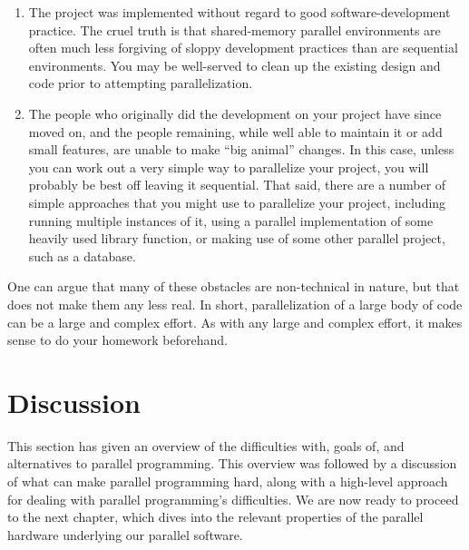 {\begin{enumerate}
		ran only on sequential hardware for most of its lifetime,
		then your project undoubtably has at least its share of
		parallel-unfriendly code.
	\item	The project was implemented without regard to good
		software-development practice.
		The cruel truth is that shared-memory parallel
		environments are often much less forgiving of sloppy
		development practices than are sequential environments.
		You may be well-served to clean up the existing design
		and code prior to attempting parallelization.
	\item	The people who originally did the development on your
		project have since moved on, and the people remaining,
		while well able to maintain it or add small features,
		are unable to make ``big animal'' changes.
		In this case, unless you can work out a very simple
		way to parallelize your project, you will probably
		be best off leaving it sequential.
		That said, there are a number of simple approaches that
		you might use
		to parallelize your project, including running multiple
		instances of it, using a parallel implementation of
		some heavily used library function, or making use of
		some other parallel project, such as a database.
	\end{enumerate}

	One can argue that many of these obstacles are non-technical
	in nature, but that does not make them any less real.
	In short, parallelization of a large body of code
	can be a large and complex effort.
	As with any large and complex effort, it makes sense to
	do your homework beforehand.
} \QuickQuizEnd

\section{Discussion}
\label{sec:intro:Discussion}

This section has given an overview of the difficulties with, goals of,
and alternatives to parallel programming.
This overview was followed by a discussion of
what can make parallel programming hard, along with a high-level
approach for dealing with parallel programming's difficulties.
We are now ready to proceed to the next chapter, which dives into the
relevant properties of the parallel hardware underlying our parallel
software.

